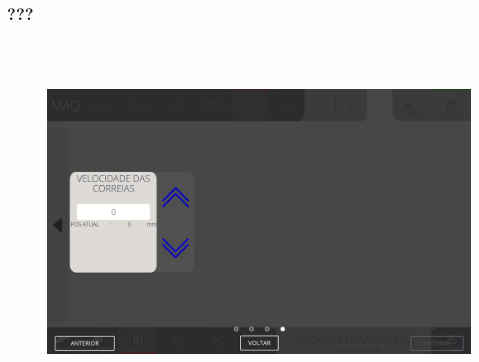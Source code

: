 \newpage
\thispagestyle{fancy}
\vspace*{\fill}
\subsubsection{\small{???}}
\begin{figure}[h]
  \centering
  \includegraphics[width=576px,height=360px]{src/imagesFlexo/07-fold/settings/e-9.png}
   \label{}
\end{figure}
\vspace*{\fill}